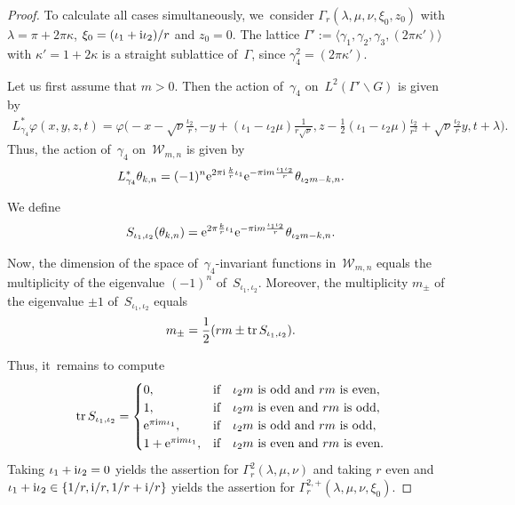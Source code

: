 \documentclass[pdftex]{sigma}
\newcommand\ph{\varphi}
\newcommand{\tr}{\mathop{{\rm tr}}}
\numberwithin{equation}{section}
\begin{document}
\begin{proof}
To calculate all cases simultaneously, we~consider $\Gamma_r(\lambda,\mu,\nu,\xi_0,z_0)$ with $\lambda=\pi+2\pi\kappa$, $\xi_0=(\iota_1+{\rm i}\iota_2)/r$ and $z_0=0$.
The lattice $\Gamma':=\langle\gamma_1,\gamma_2,\gamma_3,(2\pi\kappa')\rangle$ with $\kappa'=1+2\kappa$ is a straight sublattice of~$\Gamma$, since $\gamma_4^2=(2\pi \kappa')$.

Let us first assume that $m>0$. Then the action of~$\gamma_4$ on~$L^2(\Gamma'\backslash G)$ is given by
\begin{gather*}
L^*_{\gamma_4} \ph(x,y,z,t)=\ph\bigg(\!{-}x-\sqrt\nu \frac{\iota_2}{r},-y+(\iota_1-\iota_2\mu )\frac 1{r\sqrt\nu },z-\frac12(\iota_1-\iota_2\mu)\frac{\iota_2}{r^2}+\sqrt\nu \frac{\iota_2}{r} y,t+\lambda\!\bigg).
\end{gather*}
Thus, the action of~$\gamma_4$ on~${\mathcal W}_{m,n}$ is given by
\begin{gather*}
L^*_{\gamma_4}\theta_{k,n}=(-1)^n{\rm e}^{2\pi {\rm i}\,\frac{k}{r}\iota_1}{\rm e}^{-\pi {\rm i} m\frac{\iota_1\iota_2}{r}}\theta_{\iota_2m-k,n}.
\end{gather*}

We define
\begin{gather*}
S_{\iota_1,\iota_2}(\theta_{k,n})={\rm e}^{2\pi\frac{k}{r}\iota_1}{\rm e}^{-\pi {\rm i} m\frac{\iota_1\iota_2}{r}}\theta_{\iota_2m-k,n}.
\end{gather*}

Now, the dimension of the space of~$\gamma_4$-invariant functions in~${\mathcal W}_{m,n}$ equals the multiplicity of the eigenvalue $(-1)^n$ of~$S_{\iota_1,\iota_2}$.
Moreover, the multiplicity $m_{\pm }$ of the eigenvalue $\pm 1$ of~$S_{\iota_1,\iota_2}$ equals
\begin{gather*}
m_{\pm }=\frac{1}{2}(rm\pm\tr S_{\iota_1,\iota_2}).
\end{gather*}

Thus, it~remains to compute
\begin{gather*}
\tr S_{\iota_1,\iota_2}=
\begin{cases}
 0, &\text{if\quad $\iota_2m$ is odd and $rm$ is even},
 \\%
 1, &\text{if\quad $\iota_2m$ is even and $rm$ is odd},
 \\%
 {\rm e}^{\pi {\rm i} m\iota_1}, &\text{if\quad $\iota_2m$ is odd and $rm$ is odd},
 \\%
 1+{\rm e}^{\pi {\rm i} m\iota_1}, &\text{if\quad $\iota_2m$ is even and $rm$ is even}.
\end{cases}
\end{gather*}
Taking $\iota_1+{\rm i}\iota_2=0$ yields the assertion for $\Gamma^2_r(\lambda,\mu,\nu)$ and taking $r$ even and $\iota_1+{\rm i}\iota_2\in\{1/r,{\rm i}/r,1/r+{\rm i}/r\}$ yields the assertion for $\Gamma^{2,+}_r(\lambda,\mu,\nu,\xi_0)$.


\end{proof}
\end{document}
